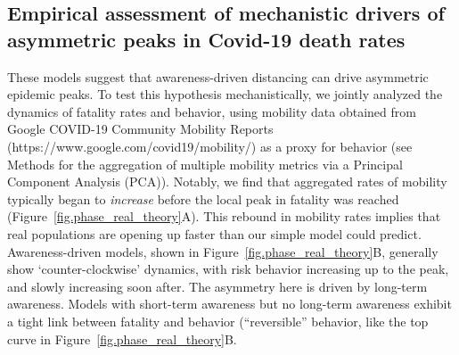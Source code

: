 \subsection{Empirical assessment of mechanistic drivers of asymmetric peaks in Covid-19 death rates}

These models suggest that 
awareness-driven distancing can drive
asymmetric epidemic peaks.
To test this hypothesis mechanistically, we jointly analyzed the dynamics of fatality
rates and behavior, using mobility
data obtained from Google COVID-19 Community Mobility Reports (https://www.google.com/covid19/mobility/)
as a proxy for behavior (see Methods for the
aggregation of multiple mobility metrics via
a Principal Component Analysis (PCA)).
Notably, we find that aggregated rates of mobility 
typically began to \emph{increase} before
the local peak in fatality was reached (Figure~\ref{fig.phase_real_theory}A).  
This rebound in mobility rates
implies that real populations are opening up faster than our simple model could predict.
Awareness-driven models, shown in Figure~\ref{fig.phase_real_theory}B,
generally show `counter-clockwise' dynamics, with risk behavior increasing up to the peak, and slowly increasing soon after.
The asymmetry here is driven by long-term awareness. 
Models with short-term awareness but no long-term awareness exhibit a tight link between fatality and behavior (``reversible'' behavior, like the top curve in  Figure~\ref{fig.phase_real_theory}B. 

